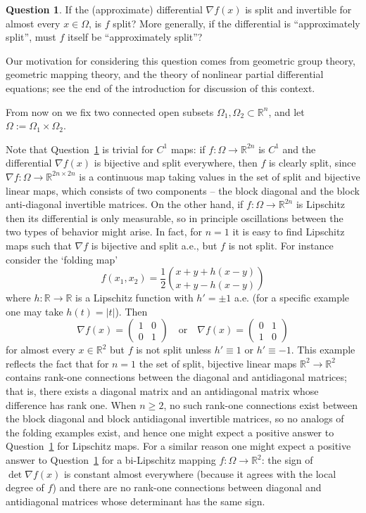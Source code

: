 \documentclass[titlepage]{amsart}
\numberwithin{equation}{section}
\theoremstyle{plain}
\theoremstyle{definition}
\newtheorem{question}[equation]{Question}
\theoremstyle{remark}
\newcommand{\Om}{\Omega}
\newcommand{\R}{\mathbb{R}}
\newcommand{\ra}{\rightarrow}
\newcommand{\g}{\nabla }
\begin{document}
\begin{question}  \label{qu:global_split}  
If the (approximate) differential $\g f(x)$ is  split and invertible for almost every $x\in \Om$, is $f$ split?  More generally, if the differential is ``approximately split'', must $f$ itself be ``approximately split''?
\end{question}
\noindent
Our motivation for considering this question comes   from   geometric group theory, geometric mapping theory, and the theory of nonlinear partial differential equations; see the end of the introduction for discussion of this context. 

From now on we fix two connected open subsets $\Om_1,\Om_2\subset \R^n$, and let $\Om:=\Om_1\times\Om_2$. 

Note that Question~\ref{qu:global_split} is trivial for $C^1$ maps: if $f:\Om\ra \R^{2n}$ is $C^1$  and the differential $\g f(x)$ is bijective and split everywhere, then $f$ is clearly split, 
since $\g f:\Om\ra \R^{2n\times 2n}$ is a continuous map taking values in the set of split and bijective linear maps, which consists of two components -- the block diagonal and the block anti-diagonal invertible matrices. On the other hand, if $f:\Om\ra \R^{2n}$ is Lipschitz then its differential is only measurable, so in principle oscillations between the two types of behavior might arise.  In fact, for $n = 1$ it is easy to find Lipschitz maps such that $\g f$  is bijective and split a.e., but $f$ is not split. For instance consider the `folding map'
$$f(x_1,x_2)=  \frac12  \binom{x+y + h(x-y)}{x+y - h(x-y)}$$
where $h : \R\to  \R$ is a Lipschitz function with $h' =  \pm 1$ a.e.
 (for a specific example one may take $h(t) = |t|$). 
 Then  
$$
\g f(x) = \begin{pmatrix} 1 & 0 \\ 0 & 1 \end{pmatrix} \quad \text{or}
\quad 
\g f(x) = \begin{pmatrix} 0 & 1 \\ 1 & 0 \end{pmatrix} 
$$
for almost every $x\in \R^2$ but  $f$ is not split unless $h' \equiv 1$ or $h' \equiv -1$. 
This example reflects the fact that for $n = 1$ the set of split, bijective linear maps $\R^2\ra \R^2$ contains rank-one connections
 between the diagonal and antidiagonal matrices; that is, there exists a diagonal matrix and an antidiagonal matrix whose difference has rank one.  When $n\geq 2$, no such rank-one connections exist between the block diagonal and block antidiagonal invertible matrices, so no analogs of the folding examples exist, and hence one might expect a positive answer to Question~\ref{qu:global_split} for Lipschitz maps. 
For a similar reason one might expect a positive answer to Question~\ref{qu:global_split} for a bi-Lipschitz mapping $f:\Om\ra\R^2$: the sign of $\det \g f(x)$ is constant almost everywhere (because it agrees with the local degree of $f$) and there are no rank-one connections between diagonal and antidiagonal matrices whose determinant has the same sign. 
\end{document}

